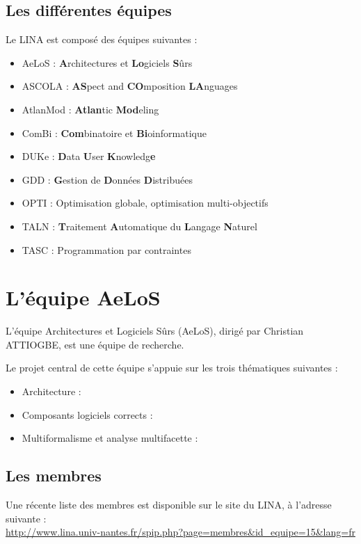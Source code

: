 \documentclass[12pt,a4paper]{report}
\begin{document}
\section{Les différentes équipes}
Le LINA est composé des équipes suivantes : 
\begin{itemize}
  \item AeLoS : \textbf{A}rchitectures et \textbf{Lo}giciels \textbf{S}ûrs
  \item ASCOLA : \textbf{AS}pect and \textbf{CO}mposition \textbf{LA}nguages
  \item AtlanMod : \textbf{Atlan}tic \textbf{Mod}eling 
  \item ComBi : \textbf{Com}binatoire et \textbf{Bi}oinformatique
  \item DUKe : \textbf{D}ata \textbf{U}ser \textbf{K}nowledg\textbf{e}
  \item GDD : \textbf{G}estion de \textbf{D}onnées \textbf{D}istribuées
  \item OPTI : Optimisation globale, optimisation multi-objectifs
  \item TALN : \textbf{T}raitement \textbf{A}utomatique du \textbf{L}angage \textbf{N}aturel
  \item TASC : Programmation par contraintes
\end{itemize}

\chapter{L'équipe AeLoS}	

L'équipe Architectures et Logiciels Sûrs (AeLoS), dirigé par Christian ATTIOGBE, est une équipe 
de recherche.

Le projet central de cette équipe s'appuie sur les trois thématiques suivantes :
\begin{itemize}[label=$\circ$]
  \item Architecture : 
  \item Composants logiciels corrects : 
  \item Multiformalisme et analyse multifacette : 
\end{itemize}

\section{Les membres}
Une récente liste des membres est disponible sur le site du LINA, à l'adresse suivante : \\
\url{http://www.lina.univ-nantes.fr/spip.php?page=membres&id_equipe=15&lang=fr}
\end{document}
